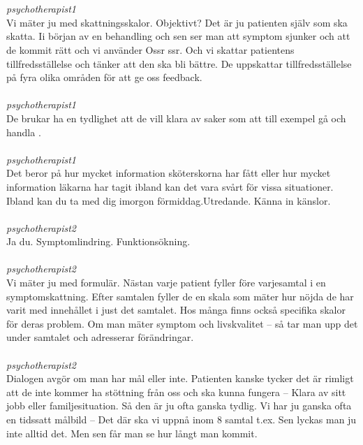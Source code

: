 \documentclass[12pt,a4paper,oneside]{article}
\begin{document}
\ \\\ \\
 { \it   psychotherapist1 %
}\\
Vi m{\"a}ter ju med skattningsskalor. Objektivt? Det {\"a}r ju patienten sj{\"a}lv som ska skatta. Ii b{\"o}rjan av en behandling och sen ser man att symptom sjunker och att de kommit r{\"a}tt och vi anv{\"a}nder Ossr ssr. Och vi skattar patientens tillfredsst{\"a}llelse och t{\"a}nker att den ska bli b{\"a}ttre. De uppskattar tillfredsst{\"a}llelse p{\aa} fyra olika omr{\aa}den f{\"o}r att ge oss feedback. %
\ \\\ \\
 { \it   psychotherapist1 %
}\\
De brukar ha en tydlighet att de vill klara av saker som att till exempel g{\aa} och handla . %
\ \\\ \\
 { \it   psychotherapist1 %
}\\
Det beror p{\aa} hur mycket information sk{\"o}terskorna har f{\aa}tt eller hur mycket information l{\"a}karna har tagit ibland kan det vara sv{\aa}rt f{\"o}r vissa situationer. Ibland kan du ta med dig imorgon f{\"o}rmiddag.Utredande. K{\"a}nna in k{\"a}nslor. %
\ \\\ \\
 { \it   psychotherapist2 %
}\\
Ja du. Symptomlindring. Funktions{\"o}kning.  %
\ \\\ \\
 { \it   psychotherapist2 %
}\\
Vi m{\"a}ter ju med formul{\"a}r. N{\"a}stan varje patient fyller f{\"o}re varjesamtal i en symptomskattning. Efter samtalen fyller de en skala som m{\"a}ter hur n{\"o}jda de har varit med inneh{\aa}llet i just det samtalet. Hos m{\aa}nga finns ocks{\aa} specifika skalor f{\"o}r deras problem. Om man m{\"a}ter symptom och livskvalitet -- s{\aa} tar man upp det under samtalet och adresserar f{\"o}r{\"a}ndringar. %
\ \\\ \\
 { \it   psychotherapist2 %
}\\
Dialogen avg{\"o}r om man har m{\aa}l eller inte. Patienten kanske tycker det {\"a}r rimligt att de inte kommer ha st{\"o}ttning fr{\aa}n oss och ska kunna fungera -- Klara av sitt jobb eller familjesituation. S{\aa} den {\"a}r ju ofta ganska tydlig. Vi har ju ganska ofta en tidssatt m{\aa}lbild -- Det d{\"a}r ska vi uppn{\aa} inom 8 samtal t.ex. Sen lyckas man ju inte alltid det. Men sen f{\aa}r man se hur l{\aa}ngt man kommit. %
\end{document}
